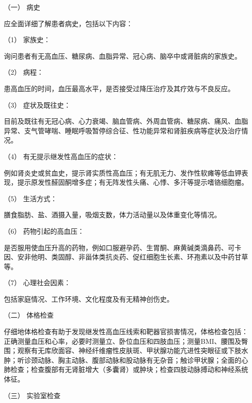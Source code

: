 \hypertarget{text00409.htmlux5cux23CHP17-3-1-3-1}{}
（一） 病史

应全面详细了解患者病史，包括以下内容：

\hypertarget{text00409.htmlux5cux23CHP17-3-1-3-1-1}{}
（1） 家族史：

询问患者有无高血压、糖尿病、血脂异常、冠心病、脑卒中或肾脏病的家族史。

\hypertarget{text00409.htmlux5cux23CHP17-3-1-3-1-2}{}
（2） 病程：

患高血压的时间，血压最高水平，是否接受过降压治疗及其疗效与不良反应。

\hypertarget{text00409.htmlux5cux23CHP17-3-1-3-1-3}{}
（3） 症状及既往史：

目前及既往有无冠心病、心力衰竭、脑血管病、外周血管病、糖尿病、痛风、血脂异常、支气管哮喘、睡眠呼吸暂停综合征、性功能异常和肾脏疾病等症状及治疗情况。

\hypertarget{text00409.htmlux5cux23CHP17-3-1-3-1-4}{}
（4） 有无提示继发性高血压的症状：

例如肾炎史或贫血史，提示肾实质性高血压；有无肌无力、发作性软瘫等低血钾表现，提示原发性醛固酮增多症；有无阵发性头痛、心悸、多汗等提示嗜铬细胞瘤。

\hypertarget{text00409.htmlux5cux23CHP17-3-1-3-1-5}{}
（5） 生活方式：

膳食脂肪、盐、酒摄入量，吸烟支数，体力活动量以及体重变化等情况。

\hypertarget{text00409.htmlux5cux23CHP17-3-1-3-1-6}{}
（6） 药物引起的高血压：

是否服用使血压升高的药物，例如口服避孕药、生胃酮、麻黄碱类滴鼻药、可卡因、安非他明、类固醇、非甾体类抗炎药、促红细胞生长素、环孢素以及中药甘草等。

\hypertarget{text00409.htmlux5cux23CHP17-3-1-3-1-7}{}
（7） 心理社会因素：

包括家庭情况、工作环境、文化程度及有无精神创伤史。

\hypertarget{text00409.htmlux5cux23CHP17-3-1-3-2}{}
（二） 体格检查

仔细地体格检查有助于发现继发性高血压线索和靶器官损害情况，体格检查包括：正确测量血压和心率，必要时测量立、卧位血压和四肢血压；测量BMI、腰围及臀围；观察有无库欣面容、神经纤维瘤性皮肤斑、甲状腺功能亢进性突眼征或下肢水肿；听诊颈动脉、胸主动脉、腹部动脉和股动脉有无杂音；触诊甲状腺；全面的心肺检查；检查腹部有无肾脏增大（多囊肾）或肿块；检查四肢动脉搏动和神经系统体征。

\hypertarget{text00409.htmlux5cux23CHP17-3-1-3-3}{}
（三） 实验室检查

